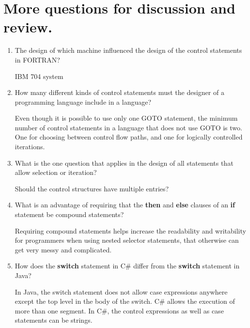 \section{More questions for discussion and review.}

\begin{enumerate}
  \item The design of which machine influenced the design
    of the control statements in FORTRAN?
  
\begin{answer}
  IBM 704 system
  \end{answer}

  \item How many different kinds of control statements
    must the designer of a programming language include
    in a language?

  \begin{answer}
	Even though it is possible to use only one GOTO statement, the minimum number of control statements in a language that does not use GOTO is two. One for choosing between control flow paths, and one for logically controlled iterations.
  \end{answer}

  \item What is the one question that applies in the
    design of all statements that allow selection or
    iteration?

  \begin{answer}
	Should the control structures have multiple entries? 
  \end{answer}

  \item What is an advantage of requiring that
    the \textbf{then} and \textbf{else} clauses of
    an \textbf{if} statement be compound statements?

  \begin{answer}
  Requiring compound statements helps increase the readability and writability for programmers when using nested selector statements, that otherwise can get very messy and complicated.
  \end{answer}

  \item How does the \textbf{switch} statement in C\#
    differ from the \textbf{switch} statement in Java?

  \begin{answer}
  In Java, the switch statement does not allow case expressions anywhere except the top level in the body of the switch.  C\#  allows the execution of more than one segment. In C\#, the control expressions as well as case statements can be strings.
   \end{answer}
  

\end{enumerate}
